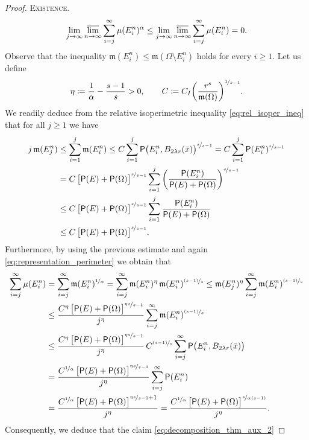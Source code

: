 \documentclass[reqno]{amsart}
\numberwithin{equation}{section}
\newcommand{\mm}{\mathfrak m}
\newcommand{\1}{\mathbbm 1}
\newcommand{\lims}{\varlimsup}
\renewcommand{\P}{{\sf P}}
\begin{document}
\begin{proof} {\color{blue}\textsc{Existence.}}
\begin{equation}\label{eq:decomposition_thm_aux_2}
\lim_{j\to\infty}\lims_{n\to\infty}\sum_{i=j}^\infty\mu(E^n_i)^\alpha\leq
\lim_{j\to\infty}\lims_{n\to\infty}\sum_{i=j}^\infty\mu(E^n_i)=0.
\end{equation}
Observe that the inequality \(\mm(E^n_i)\leq\mm(\Omega\setminus E^n_i)\) holds
for every \(i\geq 1\). Let us define
\[
\eta\coloneqq\frac{1}{\alpha}-\frac{s-1}{s}>0,\qquad
C\coloneqq C_I
\bigg(\frac{r^s}{\mm(\Omega)}\bigg)^{\nicefrac{1}{s-1}}.
\]
We readily deduce from the relative isoperimetric inequality
\eqref{eq:rel_isoper_ineq} that for all \(j\geq 1\) we have
\[\begin{split}
j\,\mm(E^n_j)&\leq\sum_{i=1}^j\mm(E^n_i)\leq
C\sum_{i=1}^j\P\big(E^n_i,B_{2\lambda r}(\bar x)\big)^{\nicefrac{s}{s-1}}
=C\sum_{i=1}^j\P(E^n_i)^{\nicefrac{s}{s-1}}\\
&=C\,\big[\P(E)+\P(\Omega)\big]^{\nicefrac{s}{s-1}}
\sum_{i=1}^j\bigg(\frac{\P(E^n_i)}{\P(E)+\P(\Omega)}\bigg)^{\nicefrac{s}{s-1}}\\
&\leq C\,\big[\P(E)+\P(\Omega)\big]^{\nicefrac{s}{s-1}}
\sum_{i=1}^j\frac{\P(E^n_i)}{\P(E)+\P(\Omega)}\\
&\leq C\,\big[\P(E)+\P(\Omega)\big]^{\nicefrac{s}{s-1}}.
\end{split}\]
Furthermore, by using the previous estimate and again
\eqref{eq:representation_perimeter} we obtain that
\[\begin{split}
\sum_{i=j}^\infty\mu(E^n_i)&=\sum_{i=j}^\infty\mm(E^n_i)^{\nicefrac{1}{\alpha}}
=\sum_{i=j}^\infty\mm(E^n_i)^\eta\,\mm(E^n_i)^{\nicefrac{(s-1)}{s}}
\leq\mm(E^n_j)^\eta\sum_{i=j}^\infty\mm(E^n_i)^{\nicefrac{(s-1)}{s}}\\
&\leq\frac{C^\eta\,\big[\P(E)+\P(\Omega)\big]^{\nicefrac{\eta s}{s-1}}}{j^\eta}
\sum_{i=j}^\infty\mm(E^n_i)^{\nicefrac{(s-1)}{s}}\\
&\leq\frac{C^\eta\,\big[\P(E)+\P(\Omega)\big]^{\nicefrac{\eta s}{s-1}}}{j^\eta}
\,C^{\nicefrac{(s-1)}{s}}\sum_{i=j}^\infty\P\big(E^n_i,B_{2\lambda r}(\bar x)\big)\\
&=\frac{C^{\nicefrac{1}{\alpha}}\,
\big[\P(E)+\P(\Omega)\big]^{\nicefrac{\eta s}{s-1}}}{j^\eta}\sum_{i=j}^\infty\P(E^n_i)\\
&=\frac{C^{\nicefrac{1}{\alpha}}\,
\big[\P(E)+\P(\Omega)\big]^{\nicefrac{\eta s}{s-1}+1}}{j^\eta}
=\frac{C^{\nicefrac{1}{\alpha}}\,
\big[\P(E)+\P(\Omega)\big]^{\nicefrac{s}{\alpha(s-1)}}}{j^\eta}.
\end{split}\]
Consequently, we deduce that the claim \eqref{eq:decomposition_thm_aux_2}

\end{proof}
\end{document}

